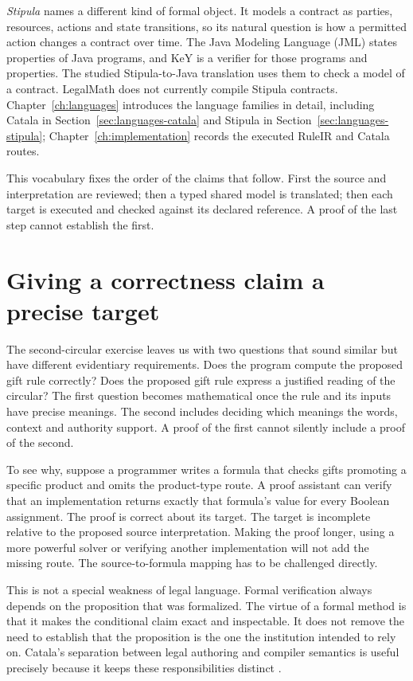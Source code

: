 \documentclass[12pt,a4paper,oneside,openany]{book}
\begin{document}
\emph{Stipula} names a different kind of formal object. It models a contract as
parties, resources, actions and state transitions, so its natural question is
how a permitted action changes a contract over time. The Java Modeling Language
(JML) states properties of Java programs, and KeY is a verifier for those
programs and properties. The studied Stipula-to-Java translation uses them to
check a model of a contract. LegalMath does not currently compile Stipula
contracts. Chapter~\ref{ch:languages}
introduces the language families in detail, including Catala in
Section~\ref{sec:languages-catala} and Stipula in
Section~\ref{sec:languages-stipula}; Chapter~\ref{ch:implementation} records
the executed RuleIR and Catala routes.

This vocabulary fixes the order of the claims that follow. First the source and
interpretation are reviewed; then a typed shared model is translated; then
each target is executed and checked against its declared reference. A proof of
the last step cannot establish the first.

\section{Giving a correctness claim a precise target}
\label{merge:M03:00}

\label{sec:proof-target}
The second-circular exercise leaves us with two questions that sound similar but
have different evidentiary requirements. Does the program compute the proposed
gift rule correctly? Does the proposed gift rule express a justified reading of
the circular? The first question becomes mathematical once the rule and its
inputs have precise meanings. The second includes deciding which meanings the
words, context and authority support. A proof of the first cannot silently
include a proof of the second.

To see why, suppose a programmer writes a formula that checks gifts promoting a
specific product and omits the product-type route. A proof assistant can verify
that an implementation returns exactly that formula's value for every Boolean
assignment. The proof is correct about its target. The target is incomplete
relative to the proposed source interpretation. Making the proof longer, using a
more powerful solver or verifying another implementation will not add the
missing route. The source-to-formula mapping has to be challenged directly.

This is not a special weakness of legal language. Formal verification always
depends on the proposition that was formalized. The virtue of a formal method
is that it makes the conditional claim exact and inspectable. It does not remove
the need to establish that the proposition is the one the institution intended
to rely on. Catala's separation between legal authoring and compiler semantics
is useful precisely because it keeps these responsibilities distinct
\citep[core language and compilation sections]{catala2021}.
\end{document}
